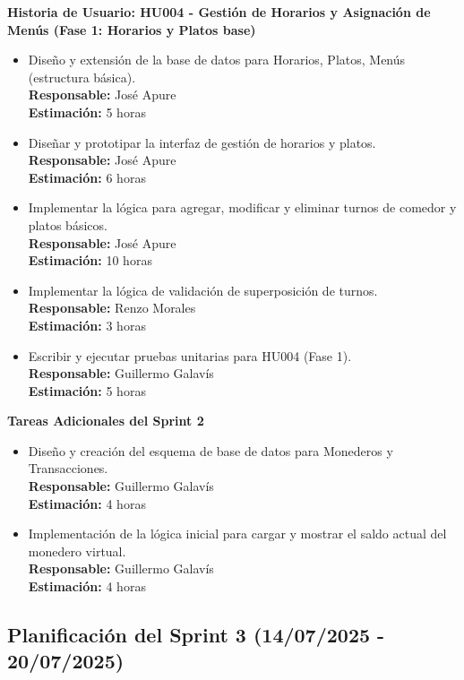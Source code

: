 \documentclass[12pt]{article}
\begin{document}
\pagebreak

\textbf{Historia de Usuario: HU004 - Gestión de Horarios y Asignación de Menús (Fase 1: Horarios y Platos base)}
\begin{itemize}
	\item Diseño y extensión de la base de datos para Horarios, Platos, Menús (estructura básica). \\
	\textbf{Responsable:} José Apure \\
	\textbf{Estimación:} 5 horas
	\item Diseñar y prototipar la interfaz de gestión de horarios y platos. \\
	\textbf{Responsable:} José Apure \\
	\textbf{Estimación:} 6 horas
	\item Implementar la lógica para agregar, modificar y eliminar turnos de comedor y platos básicos. \\
	\textbf{Responsable:} José Apure \\
	\textbf{Estimación:} 10 horas
	\item Implementar la lógica de validación de superposición de turnos. \\
	\textbf{Responsable:} Renzo Morales \\
	\textbf{Estimación:} 3 horas
	\item Escribir y ejecutar pruebas unitarias para HU004 (Fase 1). \\
	\textbf{Responsable:} Guillermo Galavís \\
	\textbf{Estimación:} 5 horas
\end{itemize}

\textbf{Tareas Adicionales del Sprint 2}

\begin{itemize}
	\item Diseño y creación del esquema de base de datos para Monederos y Transacciones. \\
	\textbf{Responsable:} Guillermo Galavís \\
	\textbf{Estimación:} 4 horas
	\item Implementación de la lógica inicial para cargar y mostrar el saldo actual del monedero virtual. \\
	\textbf{Responsable:} Guillermo Galavís \\
	\textbf{Estimación:} 4 horas
\end{itemize}

\pagebreak

\subsection{Planificación del Sprint 3 (14/07/2025 - 20/07/2025)}
\end{document}
